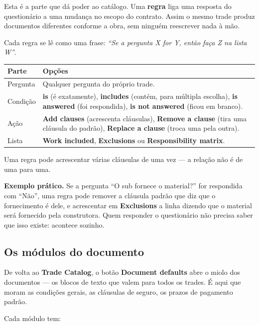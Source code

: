 \documentclass[11pt,a4paper]{article}
\newcommand{\ui}[1]{\textbf{\textsf{#1}}}
\newenvironment{aviso}
  {\par\vspace{0.7em}\noindent
   \begin{lrbox}{\avisobox}\begin{minipage}{\dimexpr\linewidth-2.4em\relax}}
  {\end{minipage}\end{lrbox}%
   \noindent\colorbox{pcglight}{\hspace{0.6em}\usebox{\avisobox}\hspace{0.6em}}%
   \vspace{0.7em}\par}
\begin{document}
Esta é a parte que dá poder ao catálogo. Uma \textbf{regra} liga uma resposta do
questionário a uma mudança no escopo do contrato. Assim o mesmo trade produz
documentos diferentes conforme a obra, sem ninguém reescrever nada à mão.

Cada regra se lê como uma frase: \emph{``Se a pergunta X for Y, então faça Z na
lista W''}.

\begin{longtable}{@{}p{3.6cm}p{11.2cm}@{}}
\toprule
\textbf{Parte} & \textbf{Opções} \\
\midrule
\endhead
Pergunta & Qualquer pergunta do próprio trade. \\[3pt]
Condição & \ui{is} (é exatamente), \ui{includes} (contém, para múltipla escolha),
\ui{is answered} (foi respondida), \ui{is not answered} (ficou em branco). \\[3pt]
Ação & \ui{Add clauses} (acrescenta cláusulas), \ui{Remove a clause} (tira uma
cláusula do padrão), \ui{Replace a clause} (troca uma pela outra). \\[3pt]
Lista & \ui{Work included}, \ui{Exclusions} ou \ui{Responsibility matrix}. \\
\bottomrule
\end{longtable}

Uma regra pode acrescentar várias cláusulas de uma vez — a relação não é de uma
para uma.

\begin{aviso}
\textbf{Exemplo prático.} Se a pergunta ``O sub fornece o material?'' for
respondida com ``Não'', uma regra pode remover a cláusula padrão que diz que o
fornecimento é dele, e acrescentar em \ui{Exclusions} a linha dizendo que o
material será fornecido pela construtora. Quem responder o questionário não
precisa saber que isso existe: acontece sozinho.
\end{aviso}

\subsection{Os módulos do documento}

De volta ao \ui{Trade Catalog}, o botão \ui{Document defaults} abre o miolo dos
documentos — os blocos de texto que valem para todos os trades. É aqui que moram
as condições gerais, as cláusulas de seguro, os prazos de pagamento padrão.

Cada módulo tem:
\end{document}
